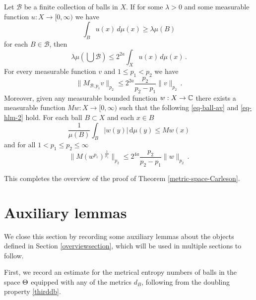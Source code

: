\begin{proposition}
\label{Hardy-Littlewood}
   Let $\mathcal{B}$ be a finite collection of balls in $X$.
If for some $\lambda>0$ and some measurable function $u:X\to [0,\infty)$ we have
\begin{equation}\label{eq-ball-assumption}
\int_{B} u(x)\, d\mu(x)\ge \lambda \mu(B)
\end{equation}
   for each $B\in \mathcal{B}$,
   then
   \begin{equation}\label{eq-besico}
\lambda \mu(\bigcup \mathcal{B}) \le 2^{2a}\int_X u(x)\, d\mu(x)\, .
\end{equation}
For every measurable function $v$
and $1\le p_1<p_2$ we have
\begin{equation}\label{eq-hlm}
    \|M_{\mathcal{B},p_1} v\|_{p_2}\le 2^{2a}\frac{p_2}{p_2-p_1} \|v\|_{p_2}\, .
\end{equation}
Moreover, given any measurable bounded function $w: X \to {\mathbb{C}}$ there exists a measurable function $Mw: X \to [0, \infty)$ such that the following \eqref{eq-ball-av} and \eqref{eq-hlm-2} hold. For each ball $B \subset X$ and each $x \in B$
\begin{equation}
    \label{eq-ball-av}
    \frac{1}{\mu(B)} \int_{B}  |w(y)| \, \mathrm{d}\mu(y) \le Mw(x)
\end{equation}
and for all $1 < p_1 \le p_2 \le \infty$
\begin{equation}
    \label{eq-hlm-2}
    \|M(w^{p_1})^{\frac{1}{p_1}}\|_{p_2} \le 2^{4a} \frac{p_2}{p_2-p_1}\|w\|_{p_2}\,.
\end{equation}

\end{proposition}

This completes the overview of the proof of Theorem \ref{metric-space-Carleson}.

\section{Auxiliary lemmas}
\label{global-auxiliary-lemmas}
We close this section by recording some auxiliary lemmas about the objects defined in Section \ref{overviewsection}, which will be used in multiple sections to follow.

First, we record an estimate for the metrical entropy numbers of balls in the space ${\Theta}$ equipped with any of the metrics $d_B$, following from the doubling property \eqref{thirddb}.

